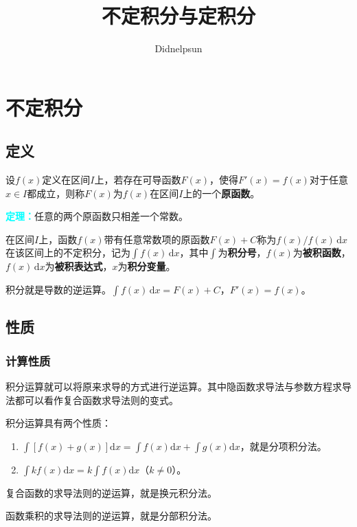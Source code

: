 \documentclass[UTF8, 12pt]{ctexart}
\author{Didnelpsun}
\title{不定积分与定积分}
\date{}
\begin{document}
\maketitle
\pagestyle{empty}
\thispagestyle{empty}
\tableofcontents
\thispagestyle{empty}
\newpage
\pagestyle{plain}
\setcounter{page}{1}
\section{不定积分}

\subsection{定义}

设$f(x)$定义在区间$I$上，若存在可导函数$F(x)$，使得$F'(x)=f(x)$对于任意$x\in I$都成立，则称$F(x)$为$f(x)$在区间$I$上的一个\textbf{原函数}。

\textcolor{aqua}{\textbf{定理：}}任意的两个原函数只相差一个常数。

在区间$I$上，函数$f(x)$带有任意常数项的原函数$F(x)+C$称为$f(x)/f(x)\,\textrm{d}x$在该区间上的不定积分，记为$\int f(x)\,\textrm{d}x$，其中$\int$为\textbf{积分号}，$f(x)$为\textbf{被积函数}，$f(x)\,\textrm{d}x$为\textbf{被积表达式}，$x$为\textbf{积分变量}。

积分就是导数的逆运算。$\int f(x)\,\textrm{d}x=F(x)+C$，$F'(x)=f(x)$。 

\subsection{性质}

\subsubsection{计算性质}

积分运算就可以将原来求导的方式进行逆运算。其中隐函数求导法与参数方程求导法都可以看作复合函数求导法则的变式。

积分运算具有两个性质：

\begin{enumerate}
    \item $\int[f(x)+g(x)]\textrm{d}x=\int f(x)\textrm{d}x+\int g(x)\textrm{d}x$，就是分项积分法。
    \item $\int kf(x)\textrm{d}x=k\int f(x)\textrm{d}x$（$k\neq 0$）。
\end{enumerate}

复合函数的求导法则的逆运算，就是换元积分法。

函数乘积的求导法则的逆运算，就是分部积分法。
\end{document}

